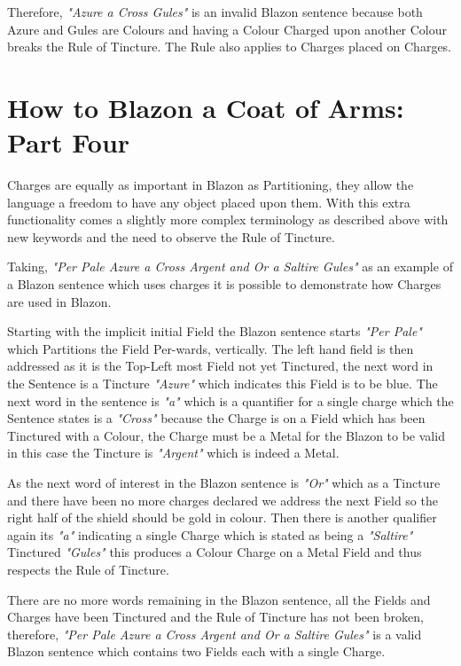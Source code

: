 Therefore, \emph{"Azure a Cross Gules"} is an invalid Blazon sentence because both Azure and Gules are Colours and having a Colour Charged upon another Colour breaks the Rule of Tincture.  The Rule also applies to Charges placed on Charges. 

\section{How to Blazon a Coat of Arms: Part Four}

Charges are equally as important in Blazon as Partitioning, they allow the language a freedom to have any object placed upon them. With this extra functionality comes a slightly more complex terminology as described above with new keywords and the need to observe the Rule of Tincture.  

Taking, \emph{"Per Pale Azure a Cross Argent and Or a Saltire Gules"} as an example of a Blazon sentence which uses charges it is possible to demonstrate how Charges are used in Blazon.  

Starting with the implicit initial Field the Blazon sentence starts \emph{"Per Pale"} which Partitions the Field Per-wards, vertically. The left hand field is then addressed as it is the Top-Left most Field not yet Tinctured, the next word in the Sentence is a Tincture \emph{"Azure"} which indicates this Field is to be blue.  The next word in the sentence is \emph{"a"} which is a quantifier for a single charge which the Sentence states is a \emph{"Cross"} because the Charge is on a Field which has been Tinctured with a Colour, the Charge must be a Metal for the Blazon to be valid in this case the Tincture is \emph{"Argent"} which is indeed a Metal.  

As the next word of interest in the Blazon sentence is \emph{"Or"} which as a Tincture and there have been no more charges declared we address the next Field so the right half of the shield should be gold in colour. Then there is another qualifier again its \emph{"a"} indicating a single Charge which is stated as being a \emph{"Saltire"} Tinctured \emph{"Gules"} this produces a Colour Charge on a Metal Field and thus respects the Rule of Tincture.  

There are no more words remaining in the Blazon sentence, all the Fields and Charges have been Tinctured and the Rule of Tincture has not been broken, therefore, \emph{"Per Pale Azure a Cross Argent and Or a Saltire Gules"} is a valid Blazon sentence which contains two Fields each with a single Charge. 


